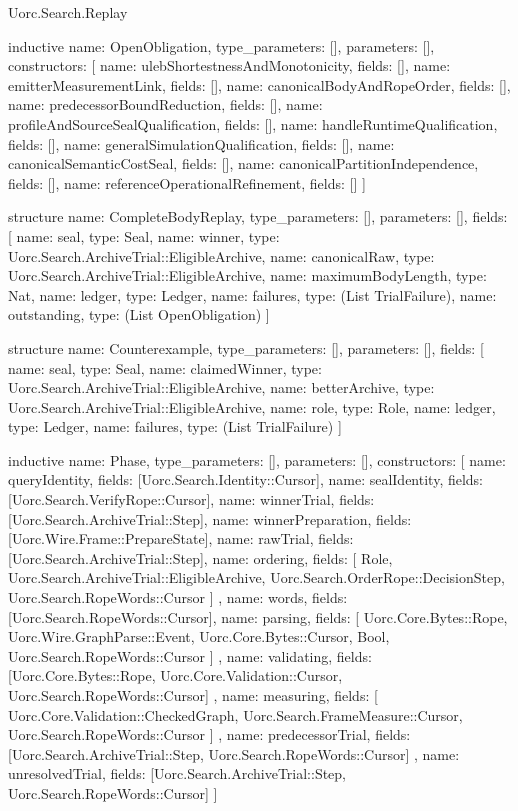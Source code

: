 \begin{lexlean}{Uorc.Search.Replay}
\begin{semanticmodule}
inductive{
  name: OpenObligation,
  type_parameters: [],
  parameters: [],
  constructors: [
    {name: ulebShortestnessAndMonotonicity, fields: []},
    {name: emitterMeasurementLink, fields: []},
    {name: canonicalBodyAndRopeOrder, fields: []},
    {name: predecessorBoundReduction, fields: []},
    {name: profileAndSourceSealQualification, fields: []},
    {name: handleRuntimeQualification, fields: []},
    {name: generalSimulationQualification, fields: []},
    {name: canonicalSemanticCostSeal, fields: []},
    {name: canonicalPartitionIndependence, fields: []},
    {name: referenceOperationalRefinement, fields: []}
  ]
}

structure{
  name: CompleteBodyReplay,
  type_parameters: [],
  parameters: [],
  fields: [
    {name: seal, type: Seal},
    {name: winner, type: Uorc.Search.ArchiveTrial::EligibleArchive},
    {name: canonicalRaw, type: Uorc.Search.ArchiveTrial::EligibleArchive},
    {name: maximumBodyLength, type: Nat},
    {name: ledger, type: Ledger},
    {name: failures, type: (List TrialFailure)},
    {name: outstanding, type: (List OpenObligation)}
  ]
}

structure{
  name: Counterexample,
  type_parameters: [],
  parameters: [],
  fields: [
    {name: seal, type: Seal},
    {name: claimedWinner, type: Uorc.Search.ArchiveTrial::EligibleArchive},
    {name: betterArchive, type: Uorc.Search.ArchiveTrial::EligibleArchive},
    {name: role, type: Role},
    {name: ledger, type: Ledger},
    {name: failures, type: (List TrialFailure)}
  ]
}

inductive{
  name: Phase,
  type_parameters: [],
  parameters: [],
  constructors: [
    {name: queryIdentity, fields: [Uorc.Search.Identity::Cursor]},
    {name: sealIdentity, fields: [Uorc.Search.VerifyRope::Cursor]},
    {name: winnerTrial, fields: [Uorc.Search.ArchiveTrial::Step]},
    {name: winnerPreparation, fields: [Uorc.Wire.Frame::PrepareState]},
    {name: rawTrial, fields: [Uorc.Search.ArchiveTrial::Step]},
    {
      name: ordering,
      fields: [
        Role,
        Uorc.Search.ArchiveTrial::EligibleArchive,
        Uorc.Search.OrderRope::DecisionStep,
        Uorc.Search.RopeWords::Cursor
      ]
    },
    {name: words, fields: [Uorc.Search.RopeWords::Cursor]},
    {
      name: parsing,
      fields: [
        Uorc.Core.Bytes::Rope,
        Uorc.Wire.GraphParse::Event,
        Uorc.Core.Bytes::Cursor,
        Bool,
        Uorc.Search.RopeWords::Cursor
      ]
    },
    {
      name: validating,
      fields: [Uorc.Core.Bytes::Rope, Uorc.Core.Validation::Cursor, Uorc.Search.RopeWords::Cursor]
    },
    {
      name: measuring,
      fields: [
        Uorc.Core.Validation::CheckedGraph,
        Uorc.Search.FrameMeasure::Cursor,
        Uorc.Search.RopeWords::Cursor
      ]
    },
    {
      name: predecessorTrial,
      fields: [Uorc.Search.ArchiveTrial::Step, Uorc.Search.RopeWords::Cursor]
    },
    {name: unresolvedTrial, fields: [Uorc.Search.ArchiveTrial::Step, Uorc.Search.RopeWords::Cursor]}
  ]
}


\end{semanticmodule}
\end{lexlean}
